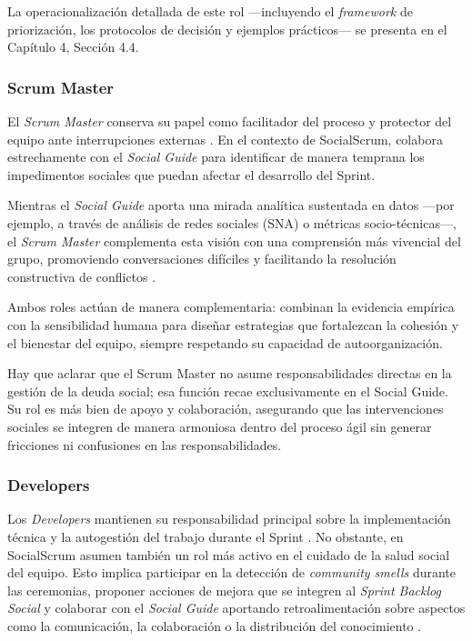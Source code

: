 La operacionalización detallada de este rol —incluyendo el \textit{framework} de priorización, los protocolos de decisión y ejemplos prácticos— se presenta en el Capítulo 4, Sección 4.4.

\subsubsection{Scrum Master}

El \textit{Scrum Master} conserva su papel como facilitador del proceso y protector del equipo ante interrupciones externas \cite{schwaber2020scrum}. En el contexto de SocialScrum, colabora estrechamente con el \textit{Social Guide} para identificar de manera temprana los impedimentos sociales que puedan afectar el desarrollo del Sprint.

Mientras el \textit{Social Guide} aporta una mirada analítica sustentada en datos —por ejemplo, a través de análisis de redes sociales (SNA) o métricas socio-técnicas—, el \textit{Scrum Master} complementa esta visión con una comprensión más vivencial del grupo, promoviendo conversaciones difíciles y facilitando la resolución constructiva de conflictos \cite{saeeda2024nontechnicaldebt}.

Ambos roles actúan de manera complementaria: combinan la evidencia empírica con la sensibilidad humana para diseñar estrategias que fortalezcan la cohesión y el bienestar del equipo, siempre respetando su capacidad de autoorganización.

Hay que aclarar que el Scrum Master no asume responsabilidades directas en la gestión de la deuda social; esa función recae exclusivamente en el Social Guide. Su rol es más bien de apoyo y colaboración, asegurando que las intervenciones sociales se integren de manera armoniosa dentro del proceso ágil sin generar fricciones ni confusiones en las responsabilidades.

\subsubsection{Developers}

Los \textit{Developers} mantienen su responsabilidad principal sobre la implementación técnica y la autogestión del trabajo durante el Sprint \cite{schwaber2020scrum}. No obstante, en SocialScrum asumen también un rol más activo en el cuidado de la salud social del equipo. Esto implica participar en la detección de \textit{community smells} durante las ceremonias, proponer acciones de mejora que se integren al \textit{Sprint Backlog Social} y colaborar con el \textit{Social Guide} aportando retroalimentación sobre aspectos como la comunicación, la colaboración o la distribución del conocimiento \cite{saeeda2024nontechnicaldebt}.


